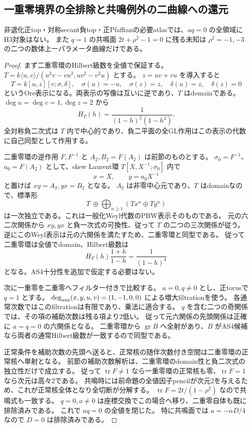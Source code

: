 \subsection{一重零境界の全排除と共鳴例外の二曲線への還元}
\begin{proposition}
非退化正top・対称secant負top・正Pfaffianの必要atlasでは、$aq=0$ の全領域にH3対象はない。
また $q=1$ の共鳴面 $2t+\rho^2-1=0$ に残る未知は $\rho^2=-1,-3$ の二つの数体上一パラメータ曲線だけである。
\end{proposition}
\begin{proof}
まず二重零環のHilbert級数を全値で保証する。
$T=k\langle u,v\rangle/(u^2v-vu^2,uv^2-v^2u)$ とする。
$z=uv+vu$ を導入すると
\[
 T=k[u,z][v;\sigma,\delta],\quad
 \sigma(u)=-u,\quad\sigma(z)=z,\quad\delta(u)=z,\quad\delta(z)=0
\]
というOre表示になる。両表示の写像は互いに逆であり、$T$ はdomainである。
$\deg u=\deg v=1,\deg z=2$ から
\[
 H_T(h)=\frac1{(1-h)^2(1-h^2)}.
\]
全対称負二次式は $T$ 内で中心的であり、負二平面の全GL作用はこの表示の代数に自己同型として作用する。

二重零環の逆作用 $F,F^{-1}$ と $A_2,B_2=F(A_2)$ は前節のものとする。
$\sigma_0=F^{-1}$、$a_0=F(A_2)$ として、skew Laurent環
$T[X,X^{-1};\sigma_0]$ 内で
\[
 x=X,\qquad y=a_0X^{-1}
\]
と置けば $xy=A_2,yx=B_2$ となる。
$A_2$ は非零中心元であり、$T$ はdomainなので、標準形
\[
 T\ \oplus\!\bigoplus_{n\ge1}(Tx^n\oplus Ty^n)
\]
は一次独立である。これは一般化Weyl代数のPBW表示そのものである。
元の六二次関係から $xy,yx$ と負一次式の可換性、従って $T$ の二つの三次関係が従う。
逆にこのWeyl表示は元の六関係を満たすため、二重零環と同型である。
従って二重零環は全値でdomain、Hilbert級数は
\[
 H_T(h)\frac{1+h}{1-h}=\frac1{(1-h)^4}
\]
となる。AS4十分性を追加で仮定する必要はない。

次に一重零を二重零へフィルター付きで比較する。
$a=0,q\ne0$ とし、正torusで $q=1$ とする。
$\deg_{\rm aux}(x,y,u,v)=(1,-1,0,0)$ による増大filtrationを使う。
各通常次数ではこのfiltrationは有限であり、乗法に適合する。
$q$ を含む二つの奇関係では、その項の補助次数は残る項より2低い。
従って元六関係の先頭関係は正確に $a=q=0$ の六関係となる。
二重零環から $\operatorname{gr}B$ へ全射があり、$B$ がAS4候補なら両者の通常Hilbert級数が一致するので同型である。

正常条件を補助次数の先頭へ送ると、正常核の随伴次数付き空間は二重零環の正常核へ単射となる。
前節の補助次数解析は、二重零環のdomain性と負二次式の独立性だけで成立する。
従って $\operatorname{tr}F\ne1$ なら一重零環の正常核も零、$\operatorname{tr}F=1$ なら次元は高々2である。
共鳴時には前命題の全値因子pencilが次元2を与えるため、これが正常核全体となり全切断が分解する。
$\operatorname{tr}F=2t/(1-\rho^2)$ なので共鳴式も一致する。
$q=0,a\ne0$ は座標交換でこの場合へ移り、二重零自体も既に排除済みである。
これで $aq=0$ の全値を閉じた。
特に共鳴面では $a=-\alpha D/4$ なので $D=0$ は排除済みである。


\end{proof}
